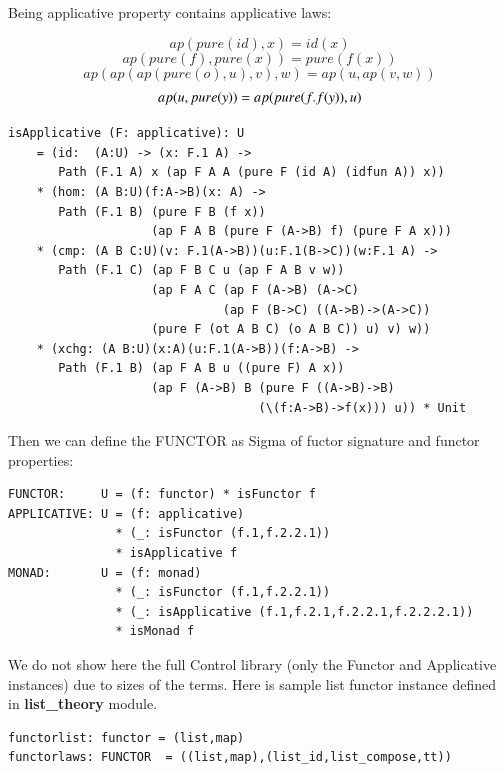\documentclass{article}
\begin{document}
Being applicative property contains applicative laws:

\begin{equation} ap(pure(id),x) = id(x) \end{equation}
\begin{equation} ap(pure(f),pure(x)) = pure(f(x)) \end{equation}
\begin{equation} ap(ap(ap(pure(o),u),v),w) = ap(u,ap(v,w)) \end{equation}
\begin{equation} ap(u,pure(y)) = ap(pure(\\f.f(y)),u) \end{equation}

\begin{lstlisting}[mathescape=true]
isApplicative (F: applicative): U
    = (id:  (A:U) -> (x: F.1 A) ->
       Path (F.1 A) x (ap F A A (pure F (id A) (idfun A)) x))
    * (hom: (A B:U)(f:A->B)(x: A) ->
       Path (F.1 B) (pure F B (f x))
                    (ap F A B (pure F (A->B) f) (pure F A x)))
    * (cmp: (A B C:U)(v: F.1(A->B))(u:F.1(B->C))(w:F.1 A) ->
       Path (F.1 C) (ap F B C u (ap F A B v w))
                    (ap F A C (ap F (A->B) (A->C)
                              (ap F (B->C) ((A->B)->(A->C))
                    (pure F (ot A B C) (o A B C)) u) v) w))
    * (xchg: (A B:U)(x:A)(u:F.1(A->B))(f:A->B) ->
       Path (F.1 B) (ap F A B u ((pure F) A x))
                    (ap F (A->B) B (pure F ((A->B)->B)
                                   (\(f:A->B)->f(x))) u)) * Unit
\end{lstlisting}

Then we can define the FUNCTOR as Sigma of fuctor signature and functor properties:

\begin{lstlisting}[mathescape=true]
FUNCTOR:     U = (f: functor) * isFunctor f
APPLICATIVE: U = (f: applicative)
               * (_: isFunctor (f.1,f.2.2.1))
               * isApplicative f
MONAD:       U = (f: monad)
               * (_: isFunctor (f.1,f.2.2.1))
               * (_: isApplicative (f.1,f.2.1,f.2.2.1,f.2.2.2.1))
               * isMonad f
\end{lstlisting}

We do not show here the full Control library (only the Functor and Applicative instances)
due to sizes of the terms. Here is sample list functor instance defined in {\bf list\_theory} module.

\begin{lstlisting}[mathescape=true]
functorlist: functor = (list,map)
functorlaws: FUNCTOR  = ((list,map),(list_id,list_compose,tt))
\end{lstlisting}
\end{document}

